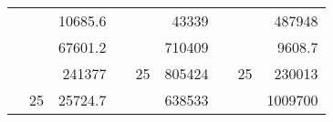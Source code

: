 \begin{table}[]
\begin{tabular}{|ccrccrccc}
\rowcolor[HTML]{DAE8FC} 
\multicolumn{1}{|c|}{\cellcolor[HTML]{FFFFC7}}                                & \multicolumn{1}{c|}{\cellcolor[HTML]{DAE8FC}}                      & \multicolumn{1}{r|}{\cellcolor[HTML]{DAE8FC}10685.6}   & \multicolumn{1}{c|}{\cellcolor[HTML]{FFFFC7}}                                & \multicolumn{1}{c|}{\cellcolor[HTML]{DAE8FC}}                       & \multicolumn{1}{r|}{\cellcolor[HTML]{DAE8FC}43339}     & \multicolumn{1}{c|}{\cellcolor[HTML]{FFFFC7}}                                & \multicolumn{1}{c|}{\cellcolor[HTML]{DAE8FC}}                      & \multicolumn{1}{r|}{\cellcolor[HTML]{DAE8FC}487948}    \\ \cline{3-3} \cline{6-6} \cline{9-9} 
\multicolumn{1}{|c|}{\cellcolor[HTML]{FFFFC7}}                                & \multicolumn{1}{c|}{\cellcolor[HTML]{DAE8FC}}                      & \multicolumn{1}{r|}{\cellcolor[HTML]{DDFDFF}67601.2}   & \multicolumn{1}{c|}{\cellcolor[HTML]{FFFFC7}}                                & \multicolumn{1}{c|}{\cellcolor[HTML]{DAE8FC}}                       & \multicolumn{1}{r|}{\cellcolor[HTML]{DDFDFF}710409}    & \multicolumn{1}{c|}{\cellcolor[HTML]{FFFFC7}}                                & \multicolumn{1}{c|}{\cellcolor[HTML]{DAE8FC}}                      & \multicolumn{1}{r|}{\cellcolor[HTML]{DDFDFF}9608.7}    \\ \cline{3-3} \cline{6-6} \cline{9-9} 
\rowcolor[HTML]{DAE8FC} 
\multicolumn{1}{|c|}{\cellcolor[HTML]{FFFFC7}}                                & \multicolumn{1}{c|}{\cellcolor[HTML]{DAE8FC}}                      & \multicolumn{1}{r|}{\cellcolor[HTML]{DAE8FC}241377}    & \multicolumn{1}{c|}{\cellcolor[HTML]{FFFFC7}}                                & \multicolumn{1}{c|}{\multirow{-9}{*}{\cellcolor[HTML]{DAE8FC}25}}   & \multicolumn{1}{r|}{\cellcolor[HTML]{DAE8FC}805424}    & \multicolumn{1}{c|}{\cellcolor[HTML]{FFFFC7}}                                & \multicolumn{1}{c|}{\multirow{-9}{*}{\cellcolor[HTML]{DAE8FC}25}}  & \multicolumn{1}{r|}{\cellcolor[HTML]{DAE8FC}230013}    \\ \cline{3-3} \cline{5-6} \cline{8-9} 
\multicolumn{1}{|c|}{\cellcolor[HTML]{FFFFC7}}                                & \multicolumn{1}{c|}{\multirow{-10}{*}{\cellcolor[HTML]{DAE8FC}25}} & \multicolumn{1}{r|}{\cellcolor[HTML]{DDFDFF}25724.7}   & \multicolumn{1}{c|}{\cellcolor[HTML]{FFFFC7}}                                & \multicolumn{1}{c|}{\cellcolor[HTML]{DDFDFF}}                       & \multicolumn{1}{r|}{\cellcolor[HTML]{DAE8FC}638533}    & \multicolumn{1}{c|}{\cellcolor[HTML]{FFFFC7}}                                & \multicolumn{1}{c|}{\cellcolor[HTML]{DDFDFF}}                      & \multicolumn{1}{r|}{\cellcolor[HTML]{DAE8FC}1009700}   \\ \cline{2-3} \cline{6-6} \cline{9-9} 

\end{tabular}
\end{table}
